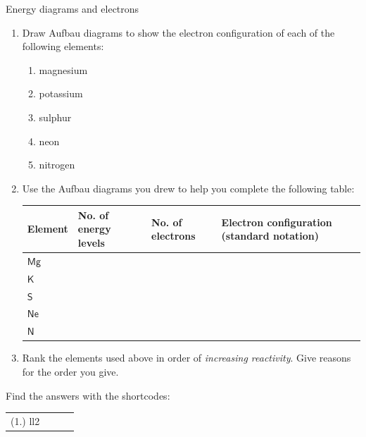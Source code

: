 \begin{exercises}{Energy diagrams and electrons}
            \nopagebreak
        \label{m38741*id260063}\begin{enumerate}[noitemsep, label=\textbf{\arabic*}. ] 
            \label{m38741*uid106}\item Draw Aufbau diagrams to show the electron configuration of each of the following elements:
\label{m38741*id260079}\begin{enumerate}[noitemsep, label=\textbf{\alph*}. ] 
            \label{m38741*uid107}\item magnesium
\label{m38741*uid108}\item potassium
\label{m38741*uid109}\item sulphur
\label{m38741*uid110}\item neon
\label{m38741*uid111}\item nitrogen
\end{enumerate}
        \label{m38741*uid112}\item Use the Aufbau diagrams you drew to help you complete the following table:
       \begin{center}
\begin{tabular}{|p{1.6cm}|p{2.6cm}|p{2.6cm}|p{2.6cm}|}\hline
\textbf{Element} & \textbf{No. of energy levels} & \textbf{No. of electrons}  & \textbf{Electron configuration (standard notation)}\\\hline
$\mathsf{Mg}$ & &  & \\\hline
$\mathsf{K}$ & &  & \\\hline
$\mathsf{S}$ & & & \\\hline
$\mathsf{Ne}$ &  & & \\\hline
$\mathsf{N}$ & & & \\\hline
\end{tabular}
\end{center}    

  \label{m38741*uid113}\item Rank the elements used above in order of \textsl{increasing reactivity}. Give reasons for the order you give.
 \end{enumerate}
 Find the answers with the shortcodes:
 \par \begin{tabular}[h]{cccc}
 (1.) ll2 & & & \end{tabular}

\label{m38741*secfhsst!!!underscore!!!id783}
\end{exercises}            
